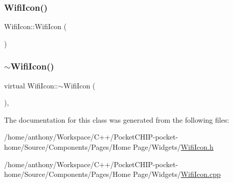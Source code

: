 \subsubsection{\texorpdfstring{Wifi\+Icon()}{WifiIcon()}}
{\footnotesize\ttfamily Wifi\+Icon\+::\+Wifi\+Icon (\begin{DoxyParamCaption}{ }\end{DoxyParamCaption})}

\mbox{\label{classWifiIcon_add720487297e455d528ed26ea8c53609}} 
\subsubsection{\texorpdfstring{$\sim$\+Wifi\+Icon()}{~WifiIcon()}}
{\footnotesize\ttfamily virtual Wifi\+Icon\+::$\sim$\+Wifi\+Icon (\begin{DoxyParamCaption}{ }\end{DoxyParamCaption})\hspace{0.3cm}{\ttfamily [inline]}, {\ttfamily [virtual]}}



The documentation for this class was generated from the following files\+:\begin{DoxyCompactItemize}
\item 
/home/anthony/\+Workspace/\+C++/\+Pocket\+C\+H\+I\+P-\/pocket-\/home/\+Source/\+Components/\+Pages/\+Home Page/\+Widgets/\mbox{\hyperlink{WifiIcon_8h}{Wifi\+Icon.\+h}}\item 
/home/anthony/\+Workspace/\+C++/\+Pocket\+C\+H\+I\+P-\/pocket-\/home/\+Source/\+Components/\+Pages/\+Home Page/\+Widgets/\mbox{\hyperlink{WifiIcon_8cpp}{Wifi\+Icon.\+cpp}}\end{DoxyCompactItemize}
